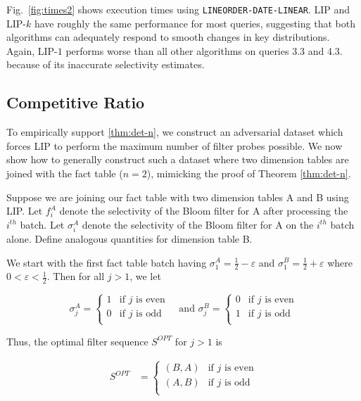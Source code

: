 Fig.~\ref{fig:times2} shows execution times using \texttt{LINEORDER-DATE-LINEAR}. 
LIP and LIP-$k$ have roughly the same performance for most queries, 
suggesting that both algorithms can adequately respond to smooth changes in key distributions.
Again, LIP-$1$ performs worse than all other algorithms on queries 3.3 and 4.3.
because of its inaccurate selectivity estimates.

\subsection{Competitive Ratio}
\label{sec:ratio}

To empirically support \ref{thm:det-n}, we construct an adversarial dataset which forces LIP to perform the maximum number of filter probes possible.
We now show how to generally construct such a dataset where two dimension tables are joined with the fact table ($n = 2$), mimicking the proof of Theorem \ref{thm:det-n}.

Suppose we are joining our fact table with two dimension tables A and B using LIP.
Let $f_i^A$ denote the selectivity of the Bloom filter for A after processing the $i^{th}$ batch. 
Let $\sigma_i^A$ denote the selectivity of the Bloom filter for A on the $i^{th}$ batch alone. 
Define analogous quantities for dimension table B.

We start with the first fact table batch having
$\sigma_1^A = \frac{1}{2} - \varepsilon$ and $\sigma_1^B = \frac{1}{2} + \varepsilon$ where $0 < \varepsilon < \frac{1}{2}$. Then for all $j > 1$, we let

\begin{equation*}
\sigma_j^A = 
    \begin{cases}
    1 & \text{if $j$ is even} \\[0.5em]
    0 & \text{if $j$ is odd} \\
    \end{cases} \quad \text{and }
\sigma_j^B = 
    \begin{cases}
    0 & \text{if $j$ is even} \\[0.5em]
    1 &  \text{if $j$ is odd} \\
    \end{cases}
\end{equation*}

Thus, the optimal filter sequence $S^{OPT}$ for $j > 1$ is 

\begin{align*}
S^{OPT} &= 
    \begin{cases}
    (B, A) & \text{if $j$ is even} \\[0.5em]
    (A, B) & \text{if $j$ is odd} \\
    \end{cases}\\[0.5em]
\end{align*}

